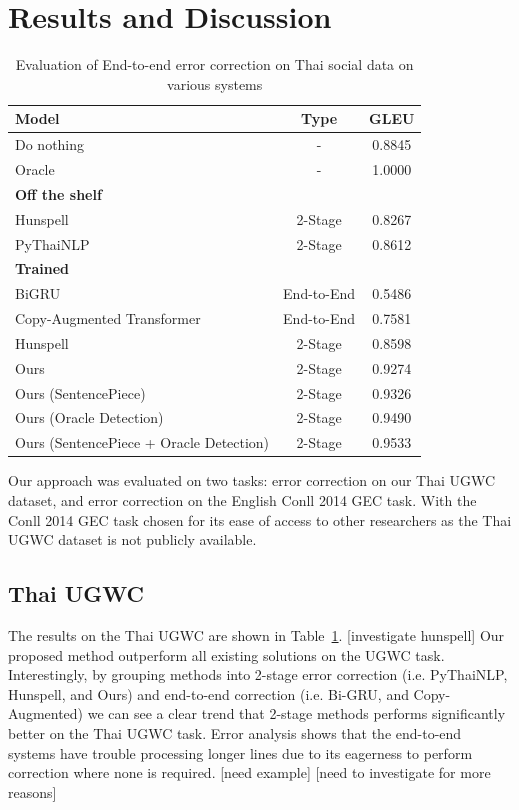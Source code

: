 
\section{Results and Discussion}

\begin{table}
  \caption{Evaluation of End-to-end error correction on Thai social data on various systems}
  \begin{tabular}{lcc}
    \toprule
    Model & Type & GLEU \\
    \midrule
    Do nothing & - & 0.8845 \\
    Oracle & - & 1.0000 \\
    \midrule
    \textbf{Off the shelf} & \\
    Hunspell & 2-Stage & 0.8267 \\
    PyThaiNLP & 2-Stage & 0.8612 \\
    \midrule
    \textbf{Trained} & \\
    BiGRU & End-to-End & 0.5486 \\
    Copy-Augmented Transformer & End-to-End & 0.7581 \\
    Hunspell & 2-Stage & 0.8598 \\
    \midrule
    Ours & 2-Stage & 0.9274 \\
    Ours (SentencePiece) & 2-Stage & 0.9326 \\
    Ours (Oracle Detection) & 2-Stage & 0.9490 \\
    Ours (SentencePiece + Oracle Detection) & 2-Stage & 0.9533 \\
    \bottomrule
  \end{tabular}
  \label{tab:e2e_ugwc}
\end{table}

Our approach was evaluated on two tasks: error correction on our Thai UGWC dataset, and error correction on the English Conll 2014 GEC task. With the Conll 2014 GEC task chosen for its ease of access to other researchers as the Thai UGWC dataset is not publicly available.

\subsection{Thai UGWC}

The results on the Thai UGWC are shown in Table~\ref{tab:e2e_ugwc}.
[investigate hunspell]
Our proposed method outperform all existing solutions on the UGWC task. Interestingly, by grouping methods into 2-stage error correction (i.e. PyThaiNLP, Hunspell, and Ours) and end-to-end correction (i.e. Bi-GRU, and Copy-Augmented) we can see a clear trend that 2-stage methods performs significantly better on the Thai UGWC task. Error analysis shows that the end-to-end systems have trouble processing longer lines due to its eagerness to perform correction where none is required. [need example] [need to investigate for more reasons]

